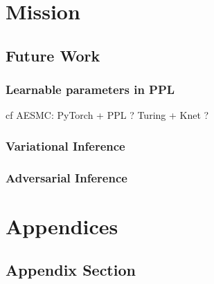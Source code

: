 \documentclass[twoside,10pt,openany,a4paper]{rapport}
\begin{document}



\chapter{Mission}






\section{Future Work}

\subsection{Learnable parameters in PPL}
cf AESMC: PyTorch + PPL ?
Turing + Knet ?

\subsection{Variational Inference}

\subsection{Adversarial Inference}





\appendix
\chapter*{Appendices}
\renewcommand{\thesection}{\Alph{section}}
\section{Appendix Section}

\nocite{*}



\end{document}
